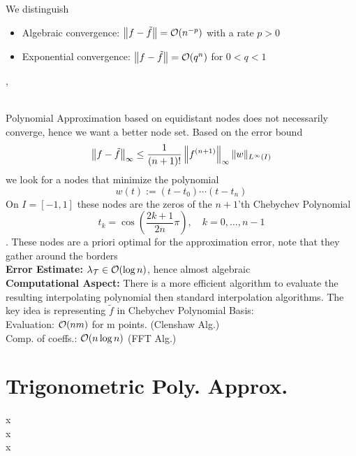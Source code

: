  We distinguish
\begin{itemize}
	\item Algebraic convergence: $\left\lVert f-\tilde{f} \right\rVert= \mathcal{O}(n^{-p})$ with a rate $p>0$
	
	\item Exponential convergence: $\left\lVert f-\tilde{f} \right\rVert= \mathcal{O}(q^{n})$ for $0<q<1$
\end{itemize}


\sep

 \\
Polynomial Approximation based on equidistant nodes does not necessarily converge, hence we want a better node set. Based on the error bound 
$$
\left\lVert f-\tilde f \right\rVert_{\infty} \leq \frac{1}{(n+1) !}\left\|f^{(n+1)}\right\|_{\infty}\|w\|_{L^{\infty}(I)}
$$
we look for a nodes that minimize the polynomial 
$$
w(t):=\left(t-t_{0}\right) \cdots\left(t-t_{n}\right)
$$
On $I=[-1,1]$ these nodes are the zeros of the $n+1$'th Chebychev Polynomial
$$t_{k}=\cos \left(\frac{2 k+1}{2 n} \pi\right), \quad k=0, \ldots, n-1$$. These nodes are a priori optimal for the approximation error, note that they gather around the borders \\
\textbf{Error Estimate:} $\lambda_\mathcal{T} \in \mathcal{O}(\log n)$, hence almost algebraic \\
\textbf{Computational Aspect:} There is a more efficient algorithm to evaluate the resulting interpolating polynomial then standard interpolation algorithms. The key idea is representing $\tilde f$ in Chebychev Polynomial Basis: \\
Evaluation: $\mathcal{O}(nm)$ for m points. (Clenshaw Alg.) \\
Comp. of coeffs.: $\mathcal{O}(n \log n)$ (FFT Alg.)

\begin{comment}

Smoothness plays a large role to gauge errors

## Finding good interpolation 
-> Chebychev Nodes are a priori optimal
-> Write down the proof of why! (kind of nice) (difference in p_n-1 and n+1 zeros -> ==0)
-> Can be done efficiently by FFT with equidistant nodes?

### 

# What is to take home of "analytic interpolation", just an upper bound on interpolation error?
def analytic ~smooth
\end{comment}

\section{Trigonometric Poly. Approx.}
x \\
x \\
x \\

